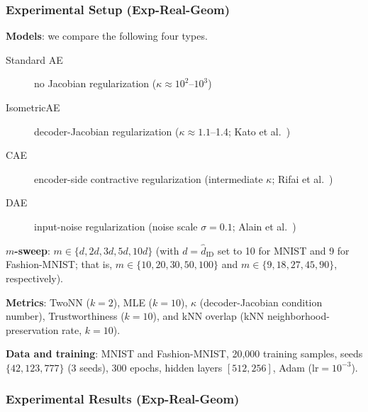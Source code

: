\documentclass[make,article,submit,pdftex,moreauthors]{Definitions/mdpi}
\newcommand{\kap}{\kappa}
\begin{document}
\subsubsection*{Experimental Setup (Exp-Real-Geom)}

\textbf{Models}: we compare the following four types.
\begin{description}
  \item[Standard AE] no Jacobian regularization ($\kap \approx 10^2$--$10^3$)
  \item[IsometricAE] decoder-Jacobian regularization ($\kap \approx 1.1$--1.4; Kato et al.~\cite{kato2020rdae})
  \item[CAE] encoder-side contractive regularization (intermediate $\kap$; Rifai et al.~\cite{rifai2011cae})
  \item[DAE] input-noise regularization (noise scale $\sigma=0.1$; Alain et al.~\cite{alain2014dae})
\end{description}

\textbf{$m$-sweep}: $m \in \{d, 2d, 3d, 5d, 10d\}$
(with $d = \hat{d}_\mathrm{ID}$ set to 10 for MNIST and 9 for Fashion-MNIST;
that is, $m \in \{10, 20, 30, 50, 100\}$ and $m \in \{9, 18, 27, 45, 90\}$,
respectively).

\textbf{Metrics}: TwoNN ($k=2$), MLE ($k=10$), $\kap$ (decoder-Jacobian
condition number), Trustworthiness ($k=10$), and kNN overlap (kNN
neighborhood-preservation rate, $k=10$).

\textbf{Data and training}: MNIST and Fashion-MNIST, 20,000 training samples,
seeds $\{42, 123, 777\}$ (3 seeds), 300 epochs, hidden layers $[512, 256]$,
Adam (lr$=10^{-3}$).

\subsubsection*{Experimental Results (Exp-Real-Geom)}
\end{document}
